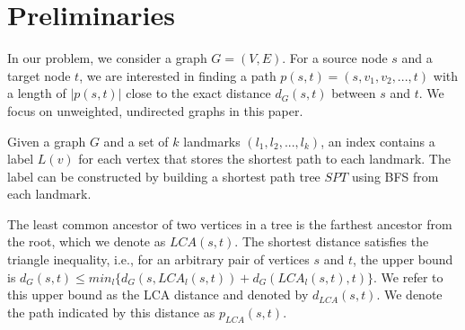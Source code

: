 \section{Preliminaries}
\label{preliminary}

In our problem, we consider a graph $G = (V,E)$. For a source node $s$ and a target node $t$, we are interested in finding a path $p(s,t)=(s,v_1,v_2,...,t)$ with a length of $|p(s,t)|$ close to the exact distance $d_G(s,t)$ between $s$ and $t$. We focus on unweighted, undirected graphs in this paper.

Given a graph $G$ and a set of $k$ landmarks $(l_1,l_2,...,l_k)$, an index contains a label $L(v)$ for each vertex that stores the shortest path to each landmark. The label can be constructed by building a shortest path tree $SPT$ using BFS from each landmark.

The least common ancestor of two vertices in a tree is the farthest ancestor from the root, which we denote as $LCA(s,t)$. The shortest distance satisfies the triangle inequality, i.e., for an arbitrary pair of vertices $s$ and $t$, the upper bound is $d_G(s,t) \leq min_{l}\{d_G(s,LCA_{l}(s,t)) + d_G(LCA_{l}(s,t),t)\}$.
We refer to this upper bound as the LCA distance and denoted by $d_{LCA}(s,t)$. We denote the path indicated by this distance as $p_{LCA}(s,t)$. 
